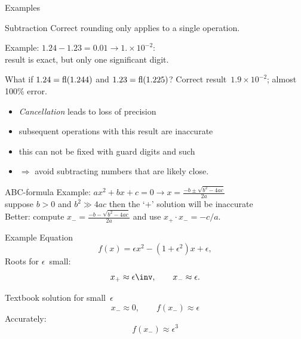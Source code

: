  {Examples}

\begin{numberedframe}{Subtraction}
Correct rounding only applies to a single operation.

Example: $1.24-1.23=0.01\rightarrow 1.\times 10^{-2}$:\\
result is exact, but only one significant digit.

What if $1.24=\mathop{\mathrm{fl}}(1.244)$ and $1.23=\mathop{\mathrm{fl}}(1.225)$? Correct
result~$1.9\times 10^{-2}$; almost 100\% error.
\begin{itemize}
\item \emph{Cancellation} leads to loss of precision
\item subsequent operations with this result are inaccurate
\item this can not be fixed with guard digits and such
\item $\Rightarrow$ avoid subtracting numbers that are likely close.
\end{itemize}
\end{numberedframe}

\begin{numberedframe}{ABC-formula}
  Example: $ax^2+bx+c=0\rightarrow x=\frac{-b\pm\sqrt{b^2-4ac}}{2a}$\\
  suppose $b>0$ and $b^2\gg 4ac$ then the `$+$' solution will be
  inaccurate\\
  Better: compute $x_-=\frac{-b-\sqrt{b^2-4ac}}{2a}$ and use $x_+\cdot
  x_-=-c/a$.
\end{numberedframe}

\begin{numberedframe}{Example}
Equation
\[ f(x) = \epsilon x^2 -(1+\epsilon^2) x + \epsilon, \]
Roots for $\epsilon$~small:
\[ x_+\approx \epsilon\inv,\qquad x_-\approx \epsilon. \]
  
Textbook solution for small~$\epsilon$
\[ x_-\approx 0, \qquad f(x_-)\approx\epsilon\]
Accurately: \[ f(x_-)\approx \epsilon^3 \]
\end{numberedframe}

